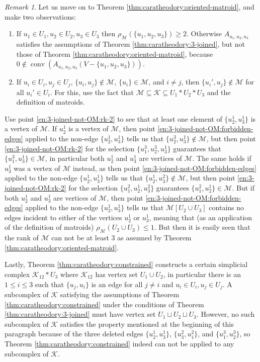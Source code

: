 \documentclass[a4paper,11pt,reqno, english]{amsart}
\theoremstyle{definition}
\theoremstyle{remark}
\newtheorem{remark}[theorem]{Remark}
\DeclareMathOperator{\conv}{\mathrm{conv}}
\begin{document}
\begin{remark}
    Let us move on to Theorem \ref{thm:caratheodory:oriented-matroid}, and make two observations:
    \begin{enumerate}[label=\normalfont{(\arabic*)}]
        \item\label{en:3-joined-not-OM:rk-2} If $u_1\in U_1,u_2\in U_2,u_3\in U_3$ then $\rho_\mathscr{M}(\{u_1,u_2,u_3\})\geq 2$. Otherwise $A_{u_1,u_2,u_3}$ satisfies the assumptions of Theorem \ref{thm:caratheodory:3-joined}, but not those of Theorem \ref{thm:caratheodory:oriented-matroid}, because $0\notin\conv(A_{u_1,u_2,u_3}(V-\{u_1,u_2,u_3\}))$.
        \item\label{en:3-joined-not-OM:forbidden-edges} If $u_i\in U_i,u_j\in U_j$, $\{u_i,u_j\}\notin\mathscr{M}$, $\{u_i\}\in\mathscr{M}$, and $i\neq j$, then $\{u_i',u_j\}\notin\mathscr{M}$ for all $u_i'\in U_i$. For this, use the fact that $\mathscr{M}\subseteq\mathscr{K}\subseteq U_1*U_2*U_3$ and the definition of matroids.
    \end{enumerate}
    Use point \ref{en:3-joined-not-OM:rk-2} to see that at least one element of $\{u_2^1,u_3^1\}$ is a vertex of $\mathscr{M}$. If $u_2^1$ is a vertex of $\mathscr{M}$, then point \ref{en:3-joined-not-OM:forbidden-edges} applied to the non-edge $\{u_2^1,u_3^1\}$ tells us that $\{u_2^3,u_3^1\}\notin\mathscr{M}$, but then point \ref{en:3-joined-not-OM:rk-2} for the selection $\{u_1^3,u_2^3,u_3^1\}$ guarantees that $\{u_1^3,u_3^1\}\in\mathscr{M}$, in particular both $u_2^1$ and $u_3^1$ are vertices of $\mathscr{M}$. The same holds if $u_3^1$ was a vertex of $\mathscr{M}$ instead, as then point \ref{en:3-joined-not-OM:forbidden-edges} applied to the non-edge $\{u_2^1,u_3^1\}$ tells us that $\{u_2^1,u_3^2\}\notin\mathscr{M}$, but then point \ref{en:3-joined-not-OM:rk-2} for the selection $\{u_1^2,u_2^1,u_3^2\}$ guarantees $\{u_1^2,u_2^1\}\in\mathscr{M}$. But if both $u_2^1$ and $u_3^1$ are vertices of $\mathscr{M}$, then point \ref{en:3-joined-not-OM:forbidden-edges} applied to the non-edge $\{u_2^1,u_3^1\}$ tells us that $\mathscr{M}[U_2\cup U_3]$ contains no edges incident to either of the vertices $u_2^1$ or $u_3^1$, meaning that (as an application of the definition of matroids) $\rho_\mathscr{M}(U_2\cup U_3)\leq1$. But then it is easily seen that the rank of $\mathscr{M}$ can not be at least $3$ as assumed by Theorem \ref{thm:caratheodory:oriented-matroid}.

    Lastly, Theorem \ref{thm:caratheodory:constrained} constructs a certain simplicial complex $\mathscr{K}_{12}*U_3$ where $\mathscr{K}_{12}$ has vertex set $U_1\cup U_2$, in particular there is an $1\leq i\leq 3$ such that $\{u_j,u_i\}$ is an edge for all $j\neq i$ and $u_i\in U_i,u_j\in U_j$. A subcomplex of $\mathscr{K}$ satisfying the assumptions of Theorem \ref{thm:caratheodory:constrained} under the conditions of Theorem \ref{thm:caratheodory:3-joined} must have vertex set $U_1\sqcup U_2\sqcup U_3$. However, no such subcomplex of $\mathscr{K}$ satisfies the property mentioned at the beginning of this paragraph because of the three deleted edges $\{u_2^1,u_3^1\}$, $\{u_3^2,u_1^2\}$, and $\{u_1^3,u_2^3\}$, so Theorem \ref{thm:caratheodory:constrained} indeed can not be applied to any subcomplex of $\mathscr{K}$.
\end{remark}
\end{document}
